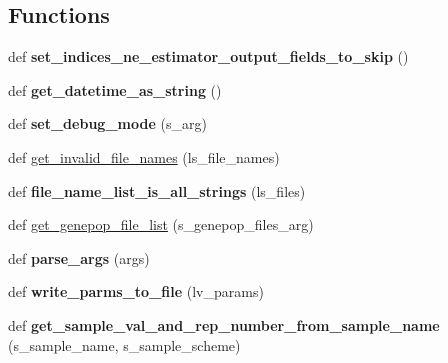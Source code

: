 \subsection*{Functions}
\begin{DoxyCompactItemize}
\item 
def {\bfseries set\+\_\+indices\+\_\+ne\+\_\+estimator\+\_\+output\+\_\+fields\+\_\+to\+\_\+skip} ()\hypertarget{namespacenegui_1_1pgdriveneestimator_a59077d0d79daf6f8b1e39172a12b5a34}{}\label{namespacenegui_1_1pgdriveneestimator_a59077d0d79daf6f8b1e39172a12b5a34}

\item 
def {\bfseries get\+\_\+datetime\+\_\+as\+\_\+string} ()\hypertarget{namespacenegui_1_1pgdriveneestimator_a7c40584a0a1685f8175c6034422adf4c}{}\label{namespacenegui_1_1pgdriveneestimator_a7c40584a0a1685f8175c6034422adf4c}

\item 
def {\bfseries set\+\_\+debug\+\_\+mode} (s\+\_\+arg)\hypertarget{namespacenegui_1_1pgdriveneestimator_a2b44aee684d792b951e5787db7b69189}{}\label{namespacenegui_1_1pgdriveneestimator_a2b44aee684d792b951e5787db7b69189}

\item 
def \hyperlink{namespacenegui_1_1pgdriveneestimator_a8972bdaeb431f941619300e9e63a0732}{get\+\_\+invalid\+\_\+file\+\_\+names} (ls\+\_\+file\+\_\+names)
\item 
def {\bfseries file\+\_\+name\+\_\+list\+\_\+is\+\_\+all\+\_\+strings} (ls\+\_\+files)\hypertarget{namespacenegui_1_1pgdriveneestimator_a3bbea10cf2e57b63cac6fffdbabd2f37}{}\label{namespacenegui_1_1pgdriveneestimator_a3bbea10cf2e57b63cac6fffdbabd2f37}

\item 
def \hyperlink{namespacenegui_1_1pgdriveneestimator_ad0c4544bb6ce5bc184615cfade0f8495}{get\+\_\+genepop\+\_\+file\+\_\+list} (s\+\_\+genepop\+\_\+files\+\_\+arg)
\item 
def {\bfseries parse\+\_\+args} (args)\hypertarget{namespacenegui_1_1pgdriveneestimator_a014177779b9f1991ca67336bd39160fa}{}\label{namespacenegui_1_1pgdriveneestimator_a014177779b9f1991ca67336bd39160fa}

\item 
def {\bfseries write\+\_\+parms\+\_\+to\+\_\+file} (lv\+\_\+params)\hypertarget{namespacenegui_1_1pgdriveneestimator_a0b74086907fdc54d2dbb0f9d797ec678}{}\label{namespacenegui_1_1pgdriveneestimator_a0b74086907fdc54d2dbb0f9d797ec678}

\item 
def {\bfseries get\+\_\+sample\+\_\+val\+\_\+and\+\_\+rep\+\_\+number\+\_\+from\+\_\+sample\+\_\+name} (s\+\_\+sample\+\_\+name, s\+\_\+sample\+\_\+scheme)\hypertarget{namespacenegui_1_1pgdriveneestimator_a85f2f02c06f18fb4888a00d40ffa9361}{}\label{namespacenegui_1_1pgdriveneestimator_a85f2f02c06f18fb4888a00d40ffa9361}


\end{DoxyCompactItemize}
